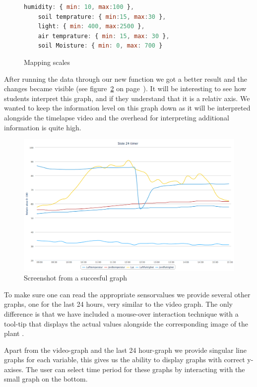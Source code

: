 \begin{figure}
	\begin{lstlisting}[language=javascript]
	humidity: { min: 10, max:100 },
	soil temprature: { min:15, max:30 },
	light: { min: 400, max:2500 },
	air temprature: { min: 15, max: 30 },
	soil Moisture: { min: 0, max: 700 }
	\end{lstlisting}
	\caption{Mapping scales}
	\label{fig:mapscale}
\end{figure}

After running the data through our new function we got a better result and the changes became visible (see figure~\ref{fig:goodgraph} on page~\pageref{fig:goodgraph}). It will be interesting to see how students interpret this graph, and if they understand that it is a relativ axis. We wanted to keep the information level on this graph down as it will be interpreted alongside the timelapse video and the overhead for interpreting additional information is quite high.  

\begin{figure}
\centering
\includegraphics[width=1\textwidth]{img/interface/goodgraph.png}
\caption{Screenshot from a succesful graph}
\label{fig:goodgraph}
\end{figure}

To make sure one can read the appropriate sensorvalues we provide several other graphs, one for the last 24 hours, very similar to the video graph. The only difference is that we have included a mouse-over interaction technique with a tool-tip that displays the actual values alongside the corresponding image of the plant \citep[p.254]{kluge2010simulation}.

Apart from the video-graph and the last 24 hour-graph we provide singular line graphs for each variable, this gives us the ability to display graphs with correct y-axises. The user can select time period for these graphs by interacting with the small graph on the bottom. 

